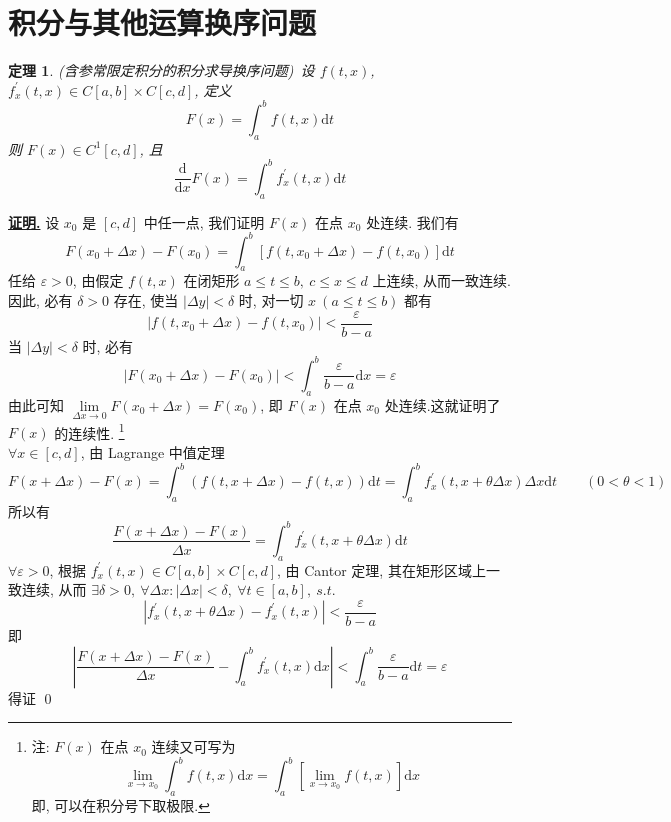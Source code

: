\documentclass[10pt,a4paper]{book}
\theoremstyle{thmstyle} %
\newtheorem{theorem}{定理}[chapter]
\theoremstyle{defstyle} %
\theoremstyle{prostyle} %
\renewenvironment{proof}[1][证明]{\par{\kaishu \uline{\textbf{#1.}}} \;\fangsong}{\qed\par}
\begin{document}
	\section{积分与其他运算换序问题}
	\begin{theorem}
		(含参常限定积分的积分求导换序问题\textsuperscript{\cite{GDJ}})\ 设 $f\left( t,x \right)$, ${f_x^{\prime}}\left( t,x \right)\in C[a,b]\times C[c,d]$, 定义
		$$
		F\left( x \right) =\int_a^b{f\left( t,x \right) \mathrm{d}t}
		$$
		则 $F(x)\in C^1[c,d]$, 且
		$$
		\frac{\mathrm{d}}{\mathrm{d}x}F\left( x \right) =\int_a^b{f_x^{\prime}\left( t,x \right) \mathrm{d}t}
		$$
	\end{theorem}
	\begin{proof}
		设 $x_0$ 是 $[c, d]$ 中任一点, 我们证明 $F(x)$ 在点 $x_0$ 处连续. 我们有
		$$
		F\left(x_0+\Delta x\right)-F\left(x_0\right)=\int_a^b\left[f\left(t, x_0+\Delta x\right)-f\left(t, x_0\right)\right]\mathrm{d}t
		$$
		任给 $\varepsilon>0$, 由假定 $f(t,x)$ 在闭矩形 $a \leqslant t \leqslant b,\ c \leqslant x \leqslant d$ 上连续, 从而一致连续. 因此, 必有 $\delta>0$ 存在, 使当 $|\Delta y|<\delta$ 时, 对一切 $x\ (a \leqslant t \leqslant b)$ 都有
		$$
		\left|f\left(t, x_0+\Delta x\right)-f\left(t, x_0\right)\right|<\frac{\varepsilon}{b-a}
		$$
		当 $|\Delta y|<\delta$ 时, 必有
		$$
		\left|F\left(x_0+\Delta x\right)-F\left(x_0\right)\right|<\int_a^b \frac{\varepsilon}{b-a}\mathrm{d}x=\varepsilon 
		$$
		由此可知 $\lim\limits_{\Delta x \rightarrow 0}F\left(x_0+\Delta x\right)=F\left(x_0\right)$, 即 $F(x)$ 在点 $x_0$ 处连续.这就证明了 $F(x)$ 的连续性.
		\footnote{注: $F(x)$ 在点 $x_0$ 连续又可写为
			$$
			\lim _{x \rightarrow x_0} \int_a^b f(t,x)\mathrm{d}x=\int_a^b\left[\lim _{x \rightarrow x_0} f(t,x)\right]\mathrm{d}x
			$$
			即, 可以在积分号下取极限.}\\
		
		$\forall x \in [c,d]$, 由 Lagrange 中值定理
		$$
		F\left( x+\Delta x \right) -F\left( x \right) =\int_a^b{\left( f\left( t,x+\Delta x \right) -f\left( t,x \right) \right) \mathrm{d}t=\int_a^b{f_x^{\prime}\left( t,x+\theta \Delta x \right)\Delta x\mathrm{d}t}}\quad\quad (0<\theta<1)
		$$		
		所以有
		$$
		\frac{F\left( x+\Delta x \right) -F\left( x \right)}{\Delta x}=\int_a^b{f_{x}^{\prime}\left( t,x+\theta \Delta x \right) \mathrm{d}t}
		$$
		$\forall \varepsilon>0$, 根据 ${f_x^{\prime}}\left( t,x \right)\in C[a,b]\times C[c,d]$, 由 Cantor 定理, 其在矩形区域上一致连续, 从而 $\exists \delta>0,\ \forall \Delta x:|\Delta x|<\delta,\ \forall t\in[a,b],\ s.t.$
		$$
		\left|f_{x}^{\prime}\left( t,x+\theta \Delta x \right) -f_{x}^{\prime}\left( t,x \right) \right|<\frac{\varepsilon}{b-a}
		$$
		即
		$$
		\left| \frac{F\left( x+\Delta x \right) -F\left( x \right)}{\Delta x}-\int_a^b{f_{x}^{\prime}\left( t,x \right)} \mathrm{d}x\right|<\int_a^b{\frac{\varepsilon}{b-a}}\mathrm{d}t=\varepsilon 
		$$	
		得证
	\end{proof}
\end{document}
